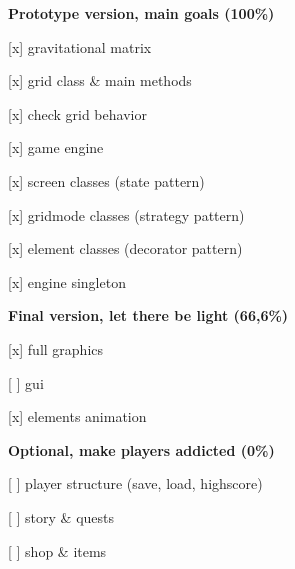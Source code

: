 {\bfseries Prototype version, main goals (100\%)}
\begin{DoxyItemize}
\item \mbox{[}x\mbox{]} gravitational matrix
\item \mbox{[}x\mbox{]} grid class \& main methods
\item \mbox{[}x\mbox{]} check grid behavior
\item \mbox{[}x\mbox{]} game engine
\item \mbox{[}x\mbox{]} screen classes (state pattern)
\item \mbox{[}x\mbox{]} gridmode classes (strategy pattern)
\item \mbox{[}x\mbox{]} element classes (decorator pattern)
\item \mbox{[}x\mbox{]} engine singleton
\end{DoxyItemize}

{\bfseries Final version, let there be light (66,6\%)}
\begin{DoxyItemize}
\item \mbox{[}x\mbox{]} full graphics
\item \mbox{[} \mbox{]} gui
\item \mbox{[}x\mbox{]} elements animation
\end{DoxyItemize}

{\bfseries Optional, make players addicted (0\%)}
\begin{DoxyItemize}
\item \mbox{[} \mbox{]} player structure (save, load, highscore)
\item \mbox{[} \mbox{]} story \& quests
\item \mbox{[} \mbox{]} shop \& items 
\end{DoxyItemize}